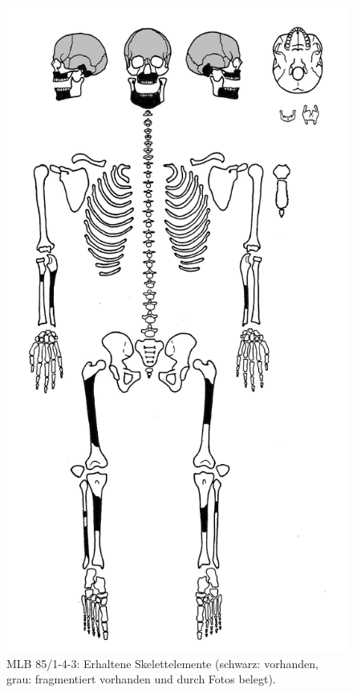 \begin{figure}[p]
	\begin{minipage}[b]{.4\textwidth}
 		\caption{MLB 85/1-4-3: Erhaltene Skelettelemente (schwarz: vorhanden, grau: fragmentiert vorhanden und durch Fotos belegt).}\label{fig:MLB85-1_SekBest_Skelettbild}
	\end{minipage}\hfill
	\begin{minipage}[b]{.55\textwidth}
 		\includegraphics[width=\textwidth]{fig/MLB85-143_Skelettbild_2013-11-09.jpg}
	\end{minipage}
\end{figure}

